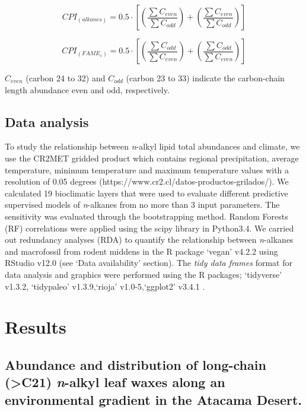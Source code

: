 \documentclass[
  authoryear,
  preprint,
  3p]{elsarticle}
\begin{document}
\[
CPI_{(alkanes)} = 0.5 \cdot \left[(\frac{\sum C_{even}}{\sum C_{odd}}) + (\frac{\sum C_{even}}{\sum C_{odd}})\right]
\]

\[
CPI_{(FAME_{s})} = 0.5 \cdot \left[(\frac{\sum C_{odd}}{\sum C_{even}}) + (\frac{\sum C_{odd}}{\sum C_{even}})\right]
\]

\(C_{even}\) (carbon 24 to 32) and \(C_{odd}\) (carbon 23 to 33)
indicate the carbon-chain length abundance even and odd, respectively.

\hypertarget{data-analysis}{%
\subsection{Data analysis}\label{data-analysis}}

To study the relationship between \emph{n}-alkyl lipid total abundances
and climate, we use the CR2MET gridded product which contains regional
precipitation, average temperature, minimum temperature and maximum
temperature values with a resolution of 0.05 degrees
(https://www.cr2.cl/datos-productos-grilados/). We calculated 19
bioclimatic layers that were used to evaluate different predictive
supervised models of \emph{n}-alkanes from no more than 3 input
parameters. The sensitivity was evaluated through the bootstrapping
method. Random Forests (RF) correlations were applied using the scipy
library in Python3.4. We carried out redundancy analyses (RDA) to
quantify the relationship between \emph{n}-alkanes and macrofossil from
rodent middens in the R package `vegan' v4.2.2 using RStudio v12.0 (see
`Data availability' section). The \emph{tidy data frames} format for
data analysis and graphics were performed using the R packages;
`tidyverse' v1.3.2, `tidypaleo' v1.3.9,`rioja' v1.0-5,`ggplot2' v3.4.1
\citep{tidyverse, tidypaleo, rioja, ggplot2}.

\hypertarget{results}{%
\section{Results}\label{results}}

\hypertarget{abundance-and-distribution-of-long-chain-c21-n-alkyl-leaf-waxes-along-an-environmental-gradient-in-the-atacama-desert.}{%
\subsection{\texorpdfstring{Abundance and distribution of long-chain
(\textgreater C21) \emph{n}-alkyl leaf waxes along an environmental
gradient in the Atacama
Desert.}{Abundance and distribution of long-chain (\textgreater C21) n-alkyl leaf waxes along an environmental gradient in the Atacama Desert.}}\label{abundance-and-distribution-of-long-chain-c21-n-alkyl-leaf-waxes-along-an-environmental-gradient-in-the-atacama-desert.}}
\end{document}

